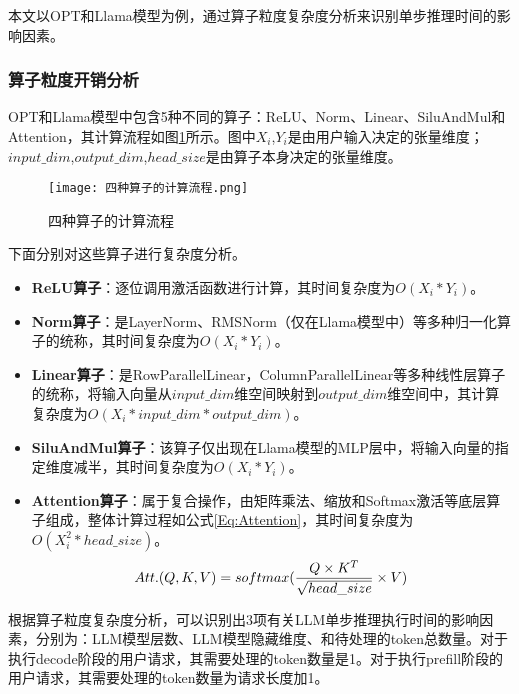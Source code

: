 本文以OPT和Llama模型为例，通过算子粒度复杂度分析来识别单步推理时间的影响因素。

\subsubsection{算子粒度开销分析}

OPT和Llama模型中包含5种不同的算子：ReLU、Norm、Linear、SiluAndMul和Attention，其计算流程如图\ref{Fig:四种算子的计算流程}所示。图中$X_i$,$Y_i$是由用户输入决定的张量维度；$input\_dim$,$output\_dim$,$head\_size$是由算子本身决定的张量维度。 

\begin{figure}[!htbp]
  \centering
  \texttt{[image: 四种算子的计算流程.png]}
  \caption{四种算子的计算流程}
  \label{Fig:四种算子的计算流程}
\end{figure}

下面分别对这些算子进行复杂度分析。

\begin{itemize}
  
  \item \textbf{ReLU算子}：逐位调用激活函数进行计算，其时间复杂度为$O(X_i*Y_i)$。
  
  \item \textbf{Norm算子}：是LayerNorm、RMSNorm（仅在Llama模型中）等多种归一化算子的统称，其时间复杂度为$O(X_i*Y_i)$。
  
  \item \textbf{Linear算子}：是RowParallelLinear，ColumnParallelLinear等多种线性层算子的统称，将输入向量从$input\_dim$维空间映射到$output\_dim$维空间中，其计算复杂度为$O(X_i*input\_dim*output\_dim)$。
  
  \item \textbf{SiluAndMul算子}：该算子仅出现在Llama模型的MLP层中，将输入向量的指定维度减半，其时间复杂度为$O(X_i*Y_i)$。
  
  \item \textbf{Attention算子}：属于复合操作，由矩阵乘法、缩放和Softmax激活等底层算子组成，整体计算过程如公式\ref{Eq:Attention}，其时间复杂度为$O(X_i^2*head\_size)$。
  \begin{equation}
    \small
    Att.(Q,K,V)=softmax(\frac{Q\times K^T}{\sqrt{head\_size}}\times V)
    \label{Eq:Attention}
  \end{equation}

\end{itemize}

根据算子粒度复杂度分析，可以识别出3项有关LLM单步推理执行时间的影响因素，分别为：LLM模型层数、LLM模型隐藏维度、和待处理的token总数量。对于执行decode阶段的用户请求，其需要处理的token数量是1。对于执行prefill阶段的用户请求，其需要处理的token数量为请求长度加1。

